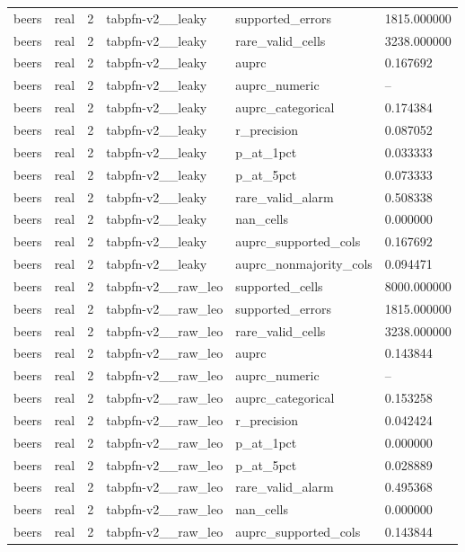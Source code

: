 \begin{tabular}{llllll}
beers & real & 2 & tabpfn-v2\_\_leaky & supported\_errors & 1815.000000 \\
beers & real & 2 & tabpfn-v2\_\_leaky & rare\_valid\_cells & 3238.000000 \\
beers & real & 2 & tabpfn-v2\_\_leaky & auprc & 0.167692 \\
beers & real & 2 & tabpfn-v2\_\_leaky & auprc\_numeric & -- \\
beers & real & 2 & tabpfn-v2\_\_leaky & auprc\_categorical & 0.174384 \\
beers & real & 2 & tabpfn-v2\_\_leaky & r\_precision & 0.087052 \\
beers & real & 2 & tabpfn-v2\_\_leaky & p\_at\_1pct & 0.033333 \\
beers & real & 2 & tabpfn-v2\_\_leaky & p\_at\_5pct & 0.073333 \\
beers & real & 2 & tabpfn-v2\_\_leaky & rare\_valid\_alarm & 0.508338 \\
beers & real & 2 & tabpfn-v2\_\_leaky & nan\_cells & 0.000000 \\
beers & real & 2 & tabpfn-v2\_\_leaky & auprc\_supported\_cols & 0.167692 \\
beers & real & 2 & tabpfn-v2\_\_leaky & auprc\_nonmajority\_cols & 0.094471 \\
beers & real & 2 & tabpfn-v2\_\_raw\_leo & supported\_cells & 8000.000000 \\
beers & real & 2 & tabpfn-v2\_\_raw\_leo & supported\_errors & 1815.000000 \\
beers & real & 2 & tabpfn-v2\_\_raw\_leo & rare\_valid\_cells & 3238.000000 \\
beers & real & 2 & tabpfn-v2\_\_raw\_leo & auprc & 0.143844 \\
beers & real & 2 & tabpfn-v2\_\_raw\_leo & auprc\_numeric & -- \\
beers & real & 2 & tabpfn-v2\_\_raw\_leo & auprc\_categorical & 0.153258 \\
beers & real & 2 & tabpfn-v2\_\_raw\_leo & r\_precision & 0.042424 \\
beers & real & 2 & tabpfn-v2\_\_raw\_leo & p\_at\_1pct & 0.000000 \\
beers & real & 2 & tabpfn-v2\_\_raw\_leo & p\_at\_5pct & 0.028889 \\
beers & real & 2 & tabpfn-v2\_\_raw\_leo & rare\_valid\_alarm & 0.495368 \\
beers & real & 2 & tabpfn-v2\_\_raw\_leo & nan\_cells & 0.000000 \\
beers & real & 2 & tabpfn-v2\_\_raw\_leo & auprc\_supported\_cols & 0.143844 \\

\end{tabular}
